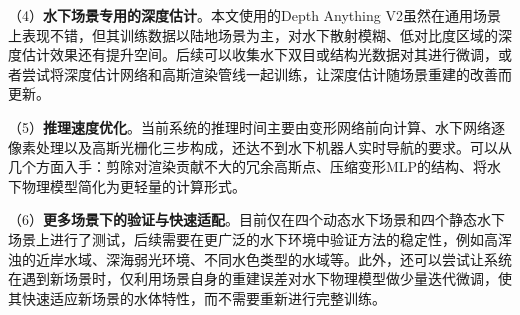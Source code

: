 （4）\textbf{水下场景专用的深度估计}。本文使用的Depth Anything V2虽然在通用场景上表现不错，但其训练数据以陆地场景为主，对水下散射模糊、低对比度区域的深度估计效果还有提升空间。后续可以收集水下双目或结构光数据对其进行微调，或者尝试将深度估计网络和高斯渲染管线一起训练，让深度估计随场景重建的改善而更新。

（5）\textbf{推理速度优化}。当前系统的推理时间主要由变形网络前向计算、水下网络逐像素处理以及高斯光栅化三步构成，还达不到水下机器人实时导航的要求。可以从几个方面入手：剪除对渲染贡献不大的冗余高斯点、压缩变形MLP的结构、将水下物理模型简化为更轻量的计算形式。

（6）\textbf{更多场景下的验证与快速适配}。目前仅在四个动态水下场景和四个静态水下场景上进行了测试，后续需要在更广泛的水下环境中验证方法的稳定性，例如高浑浊的近岸水域、深海弱光环境、不同水色类型的水域等。此外，还可以尝试让系统在遇到新场景时，仅利用场景自身的重建误差对水下物理模型做少量迭代微调，使其快速适应新场景的水体特性，而不需要重新进行完整训练。
